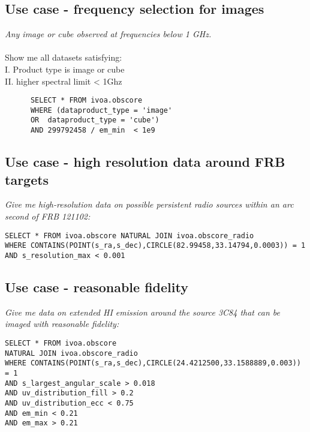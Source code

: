 \subsection{Use case - frequency selection  for images }
\textit{Any image or cube observed at frequencies below 1 GHz.}\\ \\
Show me all datasets satisfying:\\
I. Product type is image or cube \\
II. higher spectral limit < 1Ghz
\begin{verbatim}
      SELECT * FROM ivoa.obscore
      WHERE (dataproduct_type = 'image' 
      OR  dataproduct_type = 'cube') 
      AND 299792458 / em_min  < 1e9
\end{verbatim}


 


\subsection{Use case - high resolution data around FRB targets }

\textit{Give me high-resolution data on possible persistent radio sources within an arc second of FRB 121102:}

\begin{verbatim}
SELECT * FROM ivoa.obscore NATURAL JOIN ivoa.obscore_radio
WHERE CONTAINS(POINT(s_ra,s_dec),CIRCLE(82.99458,33.14794,0.0003)) = 1 
AND s_resolution_max < 0.001
\end{verbatim}

\subsection{Use case - reasonable fidelity}

\textit{Give me data on extended HI emission around the source 3C84 that can
be imaged with reasonable fidelity:}

\begin{verbatim}
SELECT * FROM ivoa.obscore 
NATURAL JOIN ivoa.obscore_radio
WHERE CONTAINS(POINT(s_ra,s_dec),CIRCLE(24.4212500,33.1588889,0.003)) = 1 
AND s_largest_angular_scale > 0.018 
AND uv_distribution_fill > 0.2 
AND uv_distribution_ecc < 0.75 
AND em_min < 0.21 
AND em_max > 0.21
\end{verbatim}

